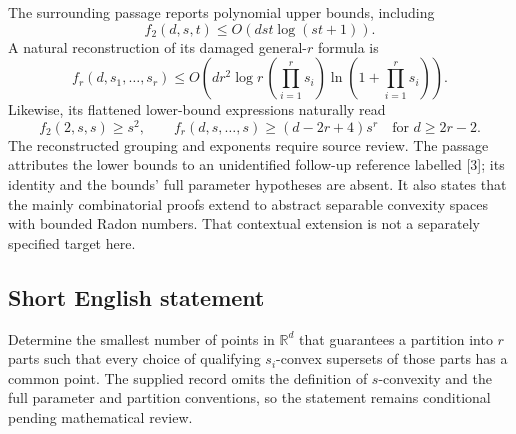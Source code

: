 \documentclass[11pt]{article}
\newcommand{\R}{\mathbb{R}}
\begin{document}
The surrounding passage reports polynomial upper bounds, including
\[
f_2(d,s,t)\leq O\!\left(dst\log(st+1)\right).
\]
A natural reconstruction of its damaged general-\(r\) formula is
\[
f_r(d,s_1,\ldots,s_r)
\leq O\!\left(dr^2\log r\,
\left(\prod_{i=1}^r s_i\right)
\ln\!\left(1+\prod_{i=1}^r s_i\right)\right).
\]
Likewise, its flattened lower-bound expressions naturally read
\[
f_2(2,s,s)\geq s^2,
\qquad
f_r(d,s,\ldots,s)\geq(d-2r+4)s^r
\quad\text{for }d\geq2r-2.
\]
The reconstructed grouping and exponents require source review. The passage attributes the lower bounds to an unidentified follow-up reference labelled [3]; its identity and the bounds' full parameter hypotheses are absent. It also states that the mainly combinatorial proofs extend to abstract separable convexity spaces with bounded Radon numbers. That contextual extension is not a separately specified target here.
\subsection{Short English statement}
Determine the smallest number of points in \(\R^d\) that guarantees a partition into \(r\) parts such that every choice of qualifying \(s_i\)-convex supersets of those parts has a common point. The supplied record omits the definition of \(s\)-convexity and the full parameter and partition conventions, so the statement remains conditional pending mathematical review.
\end{document}
